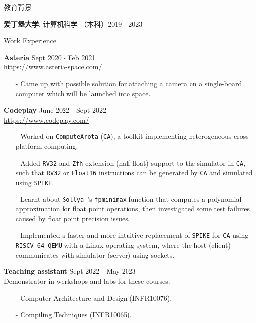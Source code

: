 \documentclass{resume} %
\newcommand{\itemsepval}{-6pt}
\newcommand{\code}{\texttt}
\begin{document}
\begin{rSection}{教育背景}

{\bf  爱丁堡大学}, 计算机科学 （本科）\hfill {2019 - 2023}

\end{rSection}

\begin{rSection}{Work Experience}

    \textbf{Asteria} \hfill Sept 2020 - Feb 2021\\
    \url{https://www.asteria-space.com/} \hfill \par
    \begin{itemize}
        \itemsep \itemsepval {} 
        \item[-] Came up with possible solution for attaching a camera on a single-board computer which will be launched into space.
    \end{itemize}
     
    \textbf{Codeplay} \hfill June 2022 - Sept 2022 \\
    \url{https://www.codeplay.com/} \hfill \par
    \begin{itemize}
        \itemsep \itemsepval {} 
        \item[-] Worked on \code{ComputeArota} (\code{CA}), a toolkit implementing heterogeneous cross-platform computing.
        \item[-] Added \code{RV32} and \code{Zfh} extension (half float) support to the simulator in \code{CA}, such that \code{RV32} or \code{Float16} instructions can be generated by \code{CA} and simulated using \code{SPIKE}.
        \item[-] Learnt about \code{Sollya }’s \code{fpminimax} function that computes a polynomial approximation for float point operations, then investigated some test failures caused by float point precision issues.
        \item[-] Implemented a faster and more intuitive replacement of \code{SPIKE} for \code{CA} using \code{RISCV-64 QEMU} with a Linux operating system, where the host (client) communicates with simulator (server) using sockets. 
    \end{itemize}
      
    \textbf{Teaching assistant} \hfill Sept 2022 - May 2023     \\
    Demonstrator in workshops and labs for these courses: \hfill \par
    \begin{itemize}
        \itemsep \itemsepval {} 
        \item[-] Computer Architecture and Design (INFR10076), 
        \item[-] Compiling Techniques (INFR10065).
    \end{itemize}


\end{rSection} 
\end{document}
